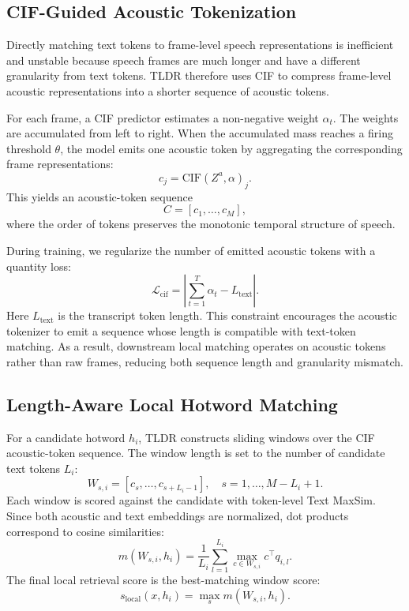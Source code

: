 \documentclass[letterpaper]{article} %
\begin{document}
\subsection{CIF-Guided Acoustic Tokenization}

Directly matching text tokens to frame-level speech representations is inefficient and unstable because speech frames are much longer and have a different granularity from text tokens. TLDR therefore uses CIF to compress frame-level acoustic representations into a shorter sequence of acoustic tokens.

For each frame, a CIF predictor estimates a non-negative weight $\alpha_t$. The weights are accumulated from left to right. When the accumulated mass reaches a firing threshold $\theta$, the model emits one acoustic token by aggregating the corresponding frame representations:
\begin{equation}
	c_j = \mathrm{CIF}(Z^a,\alpha)_j.
\end{equation}
This yields an acoustic-token sequence
\begin{equation}
	C=[c_1,\ldots,c_M],
\end{equation}
where the order of tokens preserves the monotonic temporal structure of speech.

During training, we regularize the number of emitted acoustic tokens with a quantity loss:
\begin{equation}
	\mathcal{L}_{\mathrm{cif}} =
	\left| \sum_{t=1}^{T} \alpha_t - L_{\mathrm{text}} \right|.
\end{equation}
Here $L_{\mathrm{text}}$ is the transcript token length. This constraint encourages the acoustic tokenizer to emit a sequence whose length is compatible with text-token matching. As a result, downstream local matching operates on acoustic tokens rather than raw frames, reducing both sequence length and granularity mismatch.

\subsection{Length-Aware Local Hotword Matching}

For a candidate hotword $h_i$, TLDR constructs sliding windows over the CIF acoustic-token sequence. The window length is set to the number of candidate text tokens $L_i$:
\begin{equation}
	W_{s,i}=[c_s,\ldots,c_{s+L_i-1}],
	\quad s=1,\ldots,M-L_i+1.
\end{equation}
Each window is scored against the candidate with token-level Text MaxSim. Since both acoustic and text embeddings are normalized, dot products correspond to cosine similarities:
\begin{equation}
	m(W_{s,i},h_i)=
	\frac{1}{L_i}
	\sum_{l=1}^{L_i}
	\max_{c \in W_{s,i}} c^\top q_{i,l}.
\end{equation}
The final local retrieval score is the best-matching window score:
\begin{equation}
	s_{\mathrm{local}}(x,h_i)=
	\max_s m(W_{s,i},h_i).
\end{equation}
\end{document}
